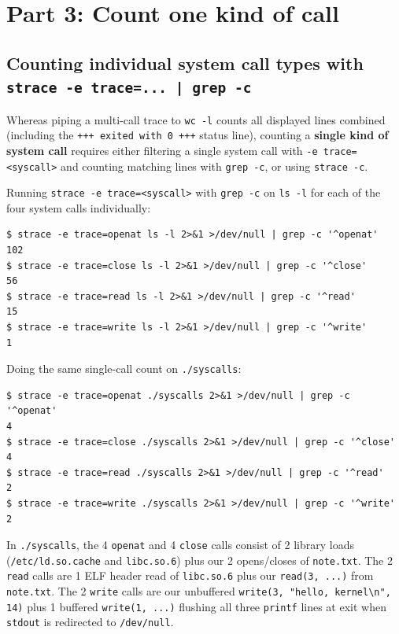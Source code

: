 \documentclass{../latex/utmreport}
\begin{document}
\chapter{Part 3: Count one kind of call}

\section{Counting individual system call types with \texttt{strace -e trace=... | grep -c}}

Whereas piping a multi-call trace to \texttt{wc -l} counts all displayed lines combined (including the \texttt{+++ exited with 0 +++} status line), counting a \textbf{single kind of system call} requires either filtering a single system call with \texttt{-e trace=<syscall>} and counting matching lines with \texttt{grep -c}, or using \texttt{strace -c}.

Running \texttt{strace -e trace=<syscall>} with \texttt{grep -c} on \texttt{ls -l} for each of the four system calls individually:

\begin{lstlisting}
$ strace -e trace=openat ls -l 2>&1 >/dev/null | grep -c '^openat'
102
$ strace -e trace=close ls -l 2>&1 >/dev/null | grep -c '^close'
56
$ strace -e trace=read ls -l 2>&1 >/dev/null | grep -c '^read'
15
$ strace -e trace=write ls -l 2>&1 >/dev/null | grep -c '^write'
1
\end{lstlisting}

Doing the same single-call count on \texttt{./syscalls}:

\begin{lstlisting}
$ strace -e trace=openat ./syscalls 2>&1 >/dev/null | grep -c '^openat'
4
$ strace -e trace=close ./syscalls 2>&1 >/dev/null | grep -c '^close'
4
$ strace -e trace=read ./syscalls 2>&1 >/dev/null | grep -c '^read'
2
$ strace -e trace=write ./syscalls 2>&1 >/dev/null | grep -c '^write'
2
\end{lstlisting}

In \texttt{./syscalls}, the 4 \texttt{openat} and 4 \texttt{close} calls consist of 2 library loads (\texttt{/etc/ld.so.cache} and \texttt{libc.so.6}) plus our 2 opens/closes of \texttt{note.txt}. The 2 \texttt{read} calls are 1 ELF header read of \texttt{libc.so.6} plus our \texttt{read(3, ...)} from \texttt{note.txt}. The 2 \texttt{write} calls are our unbuffered \texttt{write(3, "hello, kernel\textbackslash n", 14)} plus 1 buffered \texttt{write(1, ...)} flushing all three \texttt{printf} lines at exit when \texttt{stdout} is redirected to \texttt{/dev/null}.
\end{document}
